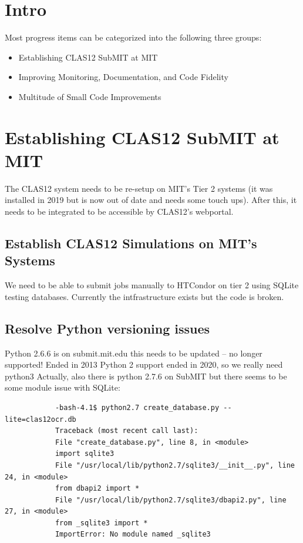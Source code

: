\section{Intro}
Most progress items can be categorized into the following three groups:
\begin{itemize}
    \item Establishing CLAS12 SubMIT at MIT
    \item Improving Monitoring, Documentation, and Code Fidelity
    \item Multitude of Small Code Improvements
\end{itemize}

\section{Establishing CLAS12 SubMIT at MIT}
    The CLAS12 system needs to be re-setup on MIT's Tier 2 systems (it was installed in 2019 but is now out of date and needs some touch ups). After this, it needs to be integrated to be accessible by CLAS12's webportal. 
    \subsection{Establish CLAS12 Simulations on MIT's Systems}
        We need to be able to submit jobs manually to HTCondor on tier 2 using SQLite testing databases. Currently the intfrastructure exists but the code is broken.
    \subsection{Resolve Python versioning issues}
        Python 2.6.6 is on submit.mit.edu this needs to be updated – no longer supported! Ended in 2013
        Python 2 support ended in 2020, so we really need python3
        Actually, also there is python 2.7.6 on SubMIT but there seems to be some module issue with SQLite:
        
        
        \begin{lstlisting}
            -bash-4.1$ python2.7 create_database.py --lite=clas12ocr.db     
            Traceback (most recent call last):          
            File "create_database.py", line 8, in <module>                  
            import sqlite3                                  
            File "/usr/local/lib/python2.7/sqlite3/__init__.py", line 24, in <module>                                           
            from dbapi2 import *            
            File "/usr/local/lib/python2.7/sqlite3/dbapi2.py", line 27, in <module>     
            from _sqlite3 import *          
            ImportError: No module named _sqlite3
        \end{lstlisting}
